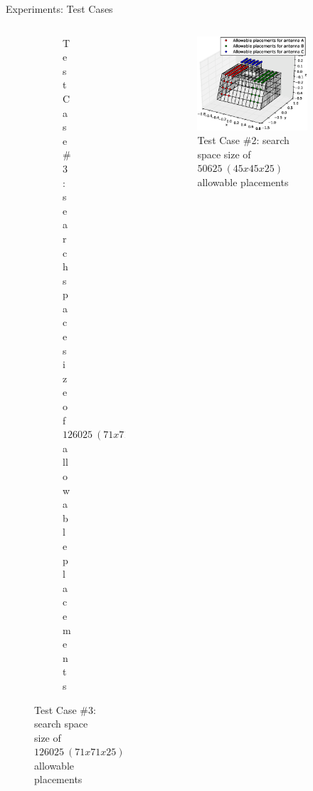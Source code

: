 \documentclass{beamer}
\begin{document}
\begin{frame}{Experiments: Test Cases}
\begin{columns}
\begin{column}{.5\columnwidth}
\begin{figure}
\begin{subfigure}{\columnwidth}
                    \caption*{\tiny Test Case \#3: search space size of $126025~(71x71x25)$ allowable placements}%
                \end{subfigure}\hfill%
            \end{figure}
        \end{column}
        \begin{column}{.5\columnwidth}
            \begin{figure}
                \vspace{-0.5cm}
                \begin{subfigure}{\columnwidth}
                    \includegraphics[trim=0 30 0 50, clip, scale=0.25]{../paper/FIG/tc2_figure}%
                    \caption*{\tiny Test Case \#2: search space size of $50625~(45x45x25)$ allowable placements}%
                \end{subfigure}\hfill\\%
                \begin{subfigure}{\columnwidth}

\end{subfigure}
\end{figure}
\end{column}
\end{columns}
\end{frame}
\end{document}

